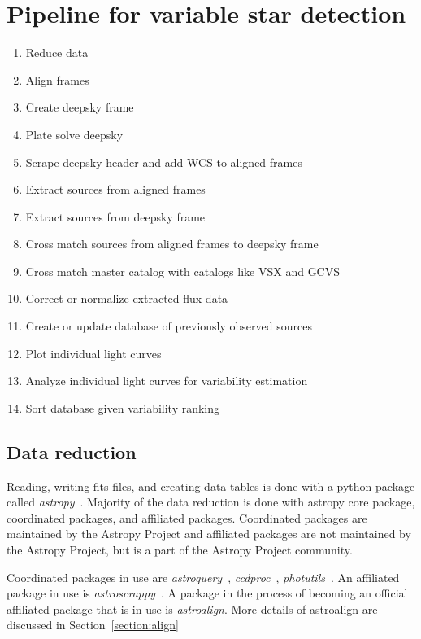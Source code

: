 \section{Pipeline for variable star detection}
\begin{enumerate}
    \item Reduce data
    \item Align frames
    \item Create deepsky frame
    \item Plate solve deepsky
    \item Scrape deepsky header and add WCS to aligned frames
    \item Extract sources from aligned frames
    \item Extract sources from deepsky frame
    \item Cross match sources from aligned frames to deepsky frame
    \item Cross match master catalog with catalogs like VSX and GCVS
    \item Correct or normalize extracted flux data
    \item Create or update database of previously observed sources
    \item Plot individual light curves
    \item Analyze individual light curves for variability estimation
    \item Sort database given variability ranking
\end{enumerate}

\subsection{Data reduction}
Reading, writing fits files, and creating data tables is done with a python
package called \textit{astropy}~\cite{astropy_2013,astropy_2018}.
Majority of the data reduction is done with astropy core package,
coordinated packages, and affiliated packages.
Coordinated packages are maintained by the Astropy Project
and affiliated packages are not maintained by the Astropy Project,
but is a part of the Astropy Project community.

Coordinated packages in use are \textit{astroquery}~\cite{astroquery}, \textit{ccdproc}~\cite{ccdproc}, \textit{photutils}~\cite{photutils}.
An affiliated package in use is \textit{astroscrappy}~\cite{astroscrappy}.
A package in the process of becoming an official affiliated package that is in use is \textit{astroalign}. 
More details of astroalign are discussed in Section~\ref{section:align} 

